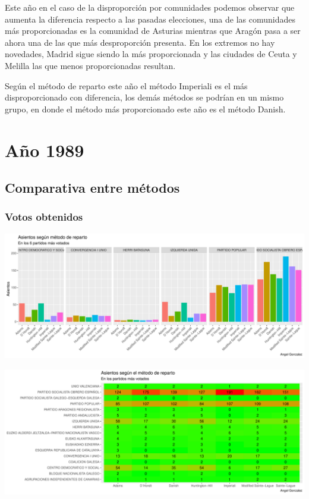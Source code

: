 \documentclass[12pt,a4paper,]{book}
\numberwithin{dummy}{section}
\theoremstyle{ocrenumbox}
\theoremstyle{blacknumex}
\theoremstyle{blacknumbox}
\theoremstyle{ocrenum}
\theoremstyle{ocrenum}
\begin{document}
Este año en el caso de la disproporción por comunidades podemos observar
que aumenta la diferencia respecto a las pasadas elecciones, una de las
comunidades más proporcionadas es la comunidad de Asturias mientras que
Aragón pasa a ser ahora una de las que más desproporción presenta. En
los extremos no hay novedades, Madrid sigue siendo la más proporcionada
y las ciudades de Ceuta y Melilla las que menos proporcionadas resultan.

Según el método de reparto este año el método Imperiali es el más
disproporcionado con diferencia, los demás métodos se podrían en un
mismo grupo, en donde el método más proporcionado este año es el método
Danish.

\hypertarget{auxf1o-1989}{%
\section{Año 1989}\label{auxf1o-1989}}

\hypertarget{comparativa-entre-muxe9todos-4}{%
\subsection{Comparativa entre
métodos}\label{comparativa-entre-muxe9todos-4}}

\hypertarget{votos-obtenidos-4}{%
\subsubsection{Votos obtenidos}\label{votos-obtenidos-4}}

\begin{center}\includegraphics[width=0.95\linewidth]{figurasR/unnamed-chunk-95-1} \end{center}

\begin{center}\includegraphics[width=0.95\linewidth]{figurasR/unnamed-chunk-95-2} \end{center}
\end{document}
